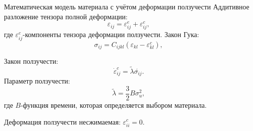 \documentclass{beamer}
\begin{document}
\begin{frame}{Математическая модель материала с учётом деформации ползучести}
\small
Аддитивное разложение тензора полной деформации:
\begin{equation*}
\varepsilon_{ij}=\varepsilon_{ij}^{e}+\varepsilon_{ij}^{c},
\end{equation*}
где $\varepsilon_{ij}^{c}$-компоненты тензора деформации ползучести. Закон Гука:
\begin{equation*}
\sigma_{ij}=C_{ijkl}(\varepsilon_{kl}-\varepsilon^{c}_{kl}),
\end{equation*}

Закон ползучести:
\begin{equation*}
\dot{\varepsilon}_{ij}^{c}=\tilde{\lambda}\acute{\sigma_{ij}}.
\end{equation*}
Параметр ползучести: 
\begin{equation*}
\tilde{\lambda}=\dfrac{3}{2}B\sigma_{u}^2,
\end{equation*}
где $B$-функция времени, которая определяется выбором материала. 

Деформация ползучести несжимаемая: $\varepsilon^{c}_{ii}=0$.
\end{frame}
\end{document}
